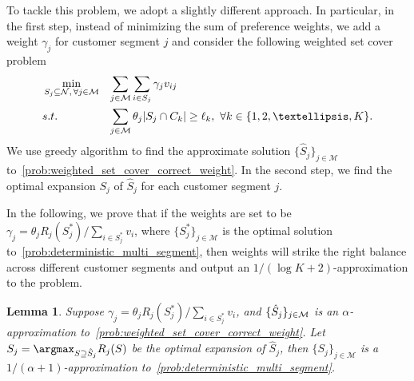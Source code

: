 \documentclass[msom,non-blindrev]{informs3} %
\newtheorem{lemma}[theorem]{Lemma}
\theoremstyle{definition}
\begin{document}
To tackle this problem, we adopt a slightly different approach. In particular, in the first step, instead of minimizing the sum of preference weights, we add a weight $\gamma_j$ for customer segment $j$ and consider the following weighted set cover problem
\begin{equation}\label{prob:weighted_set_cover_correct_weight}
\begin{aligned}
&\min_{S_j\subseteq\mathcal{N},\,\forall j\in\mathcal{M}}&&{\sum_{j\in\mathcal{M}}\sum_{i\in S_j}\gamma_jv_{ij}}\\
&\textup{s.t.}&&{\sum_{j\in\mathcal{M}}\theta_j|S_j\cap C_k|\geq \ell_k,\ \forall k\in\{1,2,\dots,K\}.}
\end{aligned}
\end{equation}
We use greedy algorithm to find the approximate solution $\{\hat{S}_j\}_{j\in\mathcal{M}}$ to~\eqref{prob:weighted_set_cover_correct_weight}. In the second step, we find the optimal expansion $S_j$ of $\hat{S}_j$ for each customer segment $j$.

In the following, we prove that if the weights are set to be $\gamma_j=\theta_jR_j(S_j^*)/\sum_{i\in S_j^*}v_i$, where $\{S_j^*\}_{j\in\mathcal{M}}$ is the optimal solution to~\eqref{prob:deterministic_multi_segment}, then weights will strike the right balance across different customer segments and output an $1/(\log K+2)$-approximation to the problem.

\begin{lemma}\label{prop:correct_weights}
Suppose $\gamma_j=\theta_jR_j(S_j^*)/\sum_{i\in S_j^*}v_i$, and $\{\hat{S}_j\}_{j \in {\cal M}}$ is an $\alpha$-approximation to~\eqref{prob:weighted_set_cover_correct_weight}. Let $S_j=\argmax_{S\supseteq\hat{S}_j}R_j(S)$ be the optimal expansion of $\hat{S}_j$, then $\{S_j\}_{j\in\mathcal{M}}$ is a $1/(\alpha+1)$-approximation to~\eqref{prob:deterministic_multi_segment}.
\end{lemma}
\end{document}
